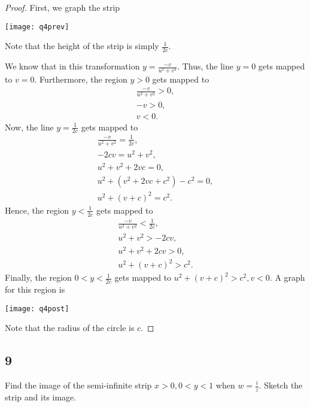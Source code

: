 \documentclass{article}
\begin{document}
\begin{proof}
    First, we graph the strip

    \texttt{[image: q4prev]}

    Note that the height of the strip is simply $\frac{1}{2c}$.

    We know that in this transformation $y = \frac{-v}{u^2 + v^2}$. Thus,
    the line $y = 0$ gets mapped to $v = 0$. Furthermore, the region
    $y > 0$ gets mapped to
    \begin{gather*}
        \frac{-v}{u^2 + v^2} > 0,\\
        -v > 0,\\
        v < 0.
    \end{gather*}
    Now, the line $y = \frac{1}{2c}$ gets mapped to
    \begin{gather*}
        \frac{-v}{u^2+v^2} = \frac{1}{2c},\\
        -2cv = u^2 + v^2,\\
        u^2 + v^2 + 2vc = 0,\\
        u^2 + (v^2 + 2vc + c^2) - c^2 = 0,\\
        u^2 + (v+c)^2 = c^2.
    \end{gather*}
    Hence, the region $y < \frac{1}{2c}$ gets mapped to
    \begin{gather*}
        \frac{-v}{u^2 + v^2} < \frac{1}{2c},\\
        u^2 + v^2 > -2cv,\\
        u^2 + v^2 + 2cv > 0,\\
        u^2 + (v+c)^2 > c^2.
    \end{gather*}
    Finally, the region $0<y<\frac{1}{2c}$ gets mapped to
    $u^2 + (v+c)^2 > c^2, v < 0$. A graph for this region is

    \texttt{[image: q4post]}

    Note that the radius of the circle is $c$.
\end{proof}

\subsection*{9} %
Find the image of the semi-infinite strip $x > 0, 0<y<1$ when $w=\frac{i }{z}$.
Sketch the strip and its image.
\end{document}
